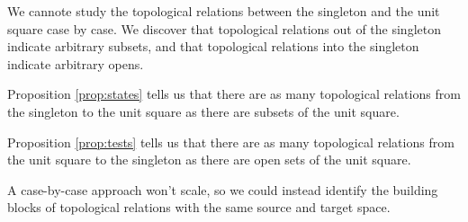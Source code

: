 \documentclass{tufte-handout}
\theoremstyle{definition}
\newtheorem{proposition}[theorem]{Proposition}
\newtheorem{term}[theorem]{Terminology}
\begin{document}
 We cannote study the topological relations between the singleton and the unit square case by case. We discover that topological relations out of the singleton indicate arbitrary subsets, and that topological relations into the singleton indicate arbitrary opens.

\newthought{$\bullet \rightarrow \blacksquare$:} Proposition \ref{prop:states} tells us that there are as many topological relations from the singleton to the unit square as there are subsets of the unit square.

\newthought{$\blacksquare \rightarrow \bullet$:} Proposition \ref{prop:tests} tells us that there are as many topological relations from the unit square to the singleton as there are open sets of the unit square.

 A case-by-case approach won't scale, so we could instead identify the building blocks of topological relations with the same source and target space.
\end{document}
